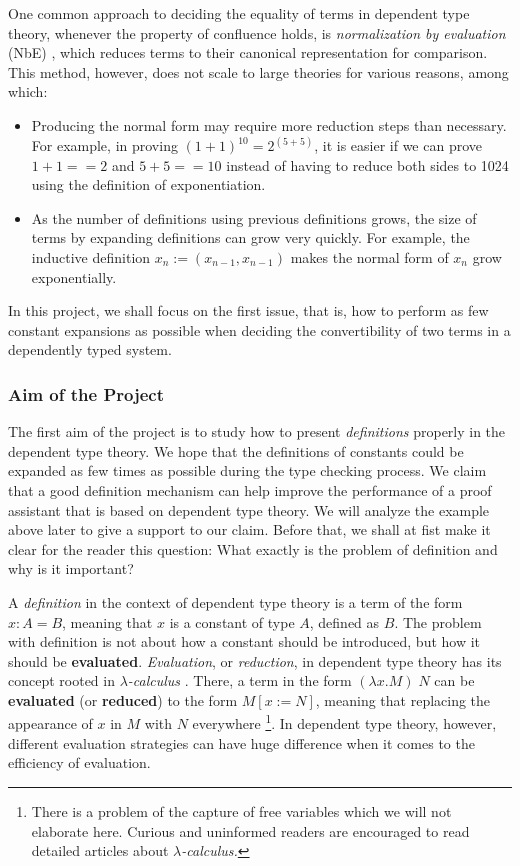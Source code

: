 \documentclass{article}
\theoremstyle{remark}
\begin{document}
One common approach to deciding the equality of terms in dependent type theory, whenever the property of confluence holds, is \textit{normalization by evaluation} (NbE) \cite{berger1998normalization}, which reduces terms to their canonical representation for comparison. This method, however, does not scale to large theories for various reasons, among which:
\begin{itemize}
\item Producing the normal form may require more reduction steps than necessary. For example, in proving $(1 + 1) ^ {10} = 2 ^{(5 + 5)}$, it is easier if we can prove $1 + 1 == 2$ and $5 + 5 == 10$ instead of having to reduce both sides to 1024 using the definition of exponentiation.
\item As the number of definitions using previous definitions grows, the size of terms by expanding definitions can grow very quickly. For example, the inductive definition $x_n := (x_{n-1}, x_{n-1})$ makes the normal form of $x_{n}$ grow exponentially.
\end{itemize}
In this project, we shall focus on the first issue, that is, how to perform as few constant expansions as possible when deciding the convertibility of two terms in a dependently typed system. 

\subsubsection{Aim of the Project}
The first aim of the project is to study how to present \emph{definitions} properly in the dependent type theory. We hope that the definitions of constants could be expanded as few times as possible during the type checking process. We claim that a good definition mechanism can help improve the performance of a proof assistant that is based on dependent type theory. We will analyze the example above later to give a support to our claim. Before that, we shall at fist make it clear for the reader this question: What exactly is the problem of definition and why is it important?

A \emph{definition} in the context of dependent type theory is a term of the form $x : A = B$, meaning that $x$ is a constant of type $A$, defined as $B$. The problem with definition is not about how a constant should be introduced, but how it should be \textbf{evaluated}. \emph{Evaluation}, or \emph{reduction}, in dependent type theory has its concept rooted in \emph{$\lambda$-calculus} \cite{barendregt1984lambda}. There, a term in the form $(\lambda x . M) \;N$ can be \textbf{evaluated} (or \textbf{reduced}) to the form $M[x := N]$, meaning that replacing the appearance of $x$ in $M$ with $N$ everywhere \footnote{There is a problem of the capture of free variables which we will not elaborate here. Curious and uninformed readers are encouraged to read detailed articles about \emph{$\lambda$-calculus.}}. In dependent type theory, however, different evaluation strategies can have huge difference when it comes to the efficiency of evaluation. 
\end{document}
